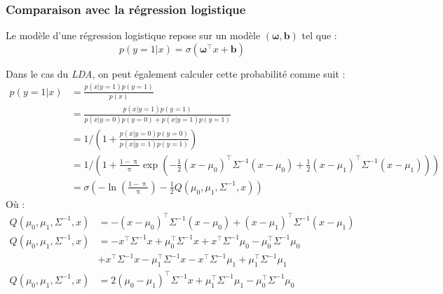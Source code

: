 \documentclass[12pt,a4paper,onecolumn]{article}
\begin{document}
\subsubsection{Comparaison avec la régression logistique}

Le modèle d'une régression logistique repose sur un modèle \( (\bm{\omega}, \bm{b})\) tel que :
\begin{equation}
	p(y = 1 | x) = \sigma(\bm{\omega}^\intercal x + \bm{b})
\end{equation}

Dans le cas du \textit{LDA}, on peut également calculer cette probabilité comme suit :
\begin{equation}
	\begin{split}
		p(y = 1 | x) &= \frac{p(x | y = 1)p(y = 1)}{p(x)} \\
		&= \frac{p(x | y = 1)p(y = 1)}{p(x | y = 0)p(y = 0) + p(x | y = 1)p(y = 1)} \\
		&= 1 / \left(1 + \frac{p(x | y = 0)p(y = 0)}{p(x | y = 1)p(y = 1)}\right)\\
		&= 1 / \left(1 + \frac{1 - \uppi}{\uppi}\exp\left(-\frac{1}{2}(x - \mu_0)^\intercal\Sigma^{-1}(x - \mu_0) + \frac{1}{2}(x - \mu_1)^\intercal\Sigma^{-1}(x - \mu_1)\right)\right)\\
		&= \sigma\left(-\ln(\frac{1 - \uppi}{\uppi}) - \frac{1}{2}Q(\mu_0, \mu_1, \Sigma^{-1}, x)\right)
	\end{split}
	\label{2_1_LDA1}
\end{equation}
Où :
\begin{equation*}
	\begin{split}
		Q(\mu_0, \mu_1, \Sigma^{-1}, x) &= -(x - \mu_0)^\intercal\Sigma^{-1}(x - \mu_0) + (x - \mu_1)^\intercal\Sigma^{-1}(x - \mu_1)\\
		Q(\mu_0, \mu_1, \Sigma^{-1}, x) &= -x^\intercal\Sigma^{-1}x + \mu_0^\intercal\Sigma^{-1}x + x^\intercal\Sigma^{-1}\mu_0 - \mu_0^\intercal\Sigma^{-1}\mu_0\\
		&+ x^\intercal\Sigma^{-1}x - \mu_1^\intercal\Sigma^{-1}x - x^\intercal\Sigma^{-1}\mu_1 + \mu_1^\intercal\Sigma^{-1}\mu_1 \\
		Q(\mu_0, \mu_1, \Sigma^{-1}, x) &= 2(\mu_0 - \mu_1)^\intercal\Sigma^{-1}x + \mu_1^\intercal\Sigma^{-1}\mu_1 - \mu_0^\intercal\Sigma^{-1}\mu_0\\
	\end{split}
\end{equation*}
\end{document}
